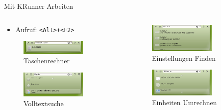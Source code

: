 \begin{frame}{Mit KRunner Arbeiten}
  \begin{columns}
    \begin{column}{0.5\textwidth}
      \begin{itemize}
        \item Aufruf: \texttt{<Alt>+<F2>}
      \end{itemize}
      \begin{figure}
        \includegraphics[keepaspectratio=true,width=0.75\textwidth]{krunner}
        \caption{Taschenrechner}
      \end{figure}  
      \begin{figure}
        \includegraphics[keepaspectratio=true,width=0.75\textwidth]{krunner2}
        \caption{Volltextsuche}
      \end{figure}
    \end{column}
    \begin{column}{0.5\textwidth}
      \begin{figure}
        \includegraphics[keepaspectratio=true,width=0.75\textwidth]{krunner3}
        \caption{Einstellungen Finden}
      \end{figure}  
      \begin{figure}
        \includegraphics[keepaspectratio=true,width=0.75\textwidth]{krunner4}
        \caption{Einheiten Umrechnen}
      \end{figure}
    \end{column}
  \end{columns}
\end{frame}

